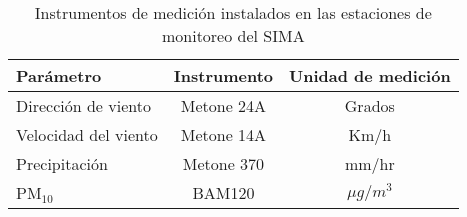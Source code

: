 \begin{table}[H]
    \centering
    \begin{tabular}{lcc} \hline
        Parámetro            & Instrumento & Unidad de medición \\ \hline
        Dirección de viento  & Metone 24A  & Grados             \\
        Velocidad del viento & Metone 14A  & Km/h               \\
        Precipitación        & Metone 370  & mm/hr              \\
        PM$_{10}$            & BAM120      & $\mu g/m^3$        \\ \hline
    \end{tabular}
    \caption{Instrumentos de medición instalados en las estaciones de monitoreo del SIMA}
    \label{table:instruments}
\end{table}